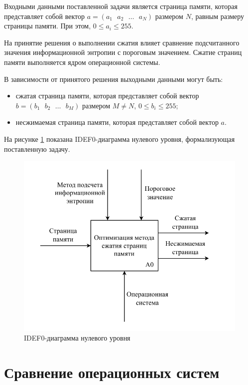 Входными данными поставленной задачи является страница памяти, которая представляет собой вектор $a = (a_1\text{ }a_2\text{ }\dotso\text{ }a_N)$ размером $N$, равным размеру страницы памяти. При этом, $0 \leq a_i \leq 255$.

На принятие решения о выполнении сжатия влияет сравнение подсчитанного значения информационной энтропии с пороговым значением. Сжатие страниц памяти выполняется ядром операционной системы.

В зависимости от принятого решения выходными данными могут быть:
\begin{itemize}
	\item сжатая страница памяти, которая представляет собой вектор $b = (b_1\text{ }b_2\text{ }\dotso\text{ }b_M)$ размером $M \neq N$, $0 \leq b_i \leq 255$;
    \item несжимаемая страница памяти, которая представляет собой вектор $a$.
\end{itemize}

На рисунке \ref{img:zero-level} показана IDEF0-диаграмма нулевого уровня, формализующая поставленную задачу.

\begin{figure}[H]
	\begin{center}
		\includegraphics[scale=0.7]{inc/img/zero-level.pdf}
	\end{center}
	\captionsetup{justification=centering}
	\caption{IDEF0-диаграмма нулевого уровня}
	\label{img:zero-level}
\end{figure}

\section{Сравнение операционных систем}

